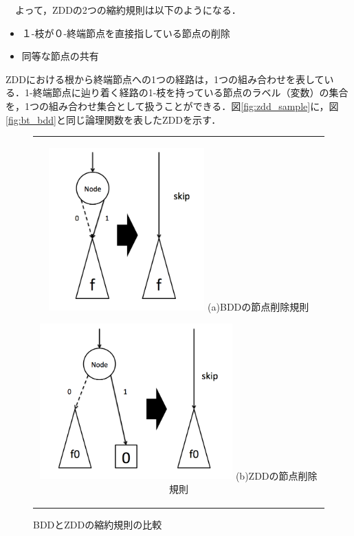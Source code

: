 \documentclass[12pt,twoside, fleqn]{ujbook}
\begin{document}
	　よって，ZDDの2つの縮約規則は以下のようになる．
	\begin{itemize}
		\item １-枝が０-終端節点を直接指している節点の削除
		\item 同等な節点の共有
	\end{itemize}

	ZDDにおける根から終端節点への1つの経路は，1つの組み合わせを表している．1-終端節点に辿り着く経路の1-枝を持っている節点のラベル（変数）の集合を，1つの組み合わせ集合として扱うことができる．図\ref{fig:zdd_sample}に，図\ref{fig:bt_bdd}と同じ論理関数を表したZDDを示す．\\


	\begin{figure}[htbp]
	\begin{center}
	\begin{tabular}{c}
		\begin{minipage}{0.5\hsize}
			\begin{center}
			\includegraphics [clip, width=6cm]{./img/bddrule-1.png}
			\hspace{1.6cm} (a)BDDの節点削除規則
			\end{center}
		\end{minipage}

		\begin{minipage}{0.5\hsize}
			\begin{center}
			\includegraphics [clip, height=6cm]{./img/zddrule.png}
			\hspace{1.6cm} (b)ZDDの節点削除規則
			\end{center}
		\end{minipage}
	\end{tabular}
	\caption{BDDとZDDの縮約規則の比較}
	\label{fig:suprules}
	\end{center}
	\end{figure}
\end{document}
